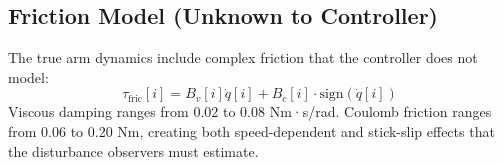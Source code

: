 \subsection{Friction Model (Unknown to Controller)}
The true arm dynamics include complex friction that the controller does not model:
\begin{equation}
    \tau_{\text{fric}}[i] = B_{v}[i] \dot{q}[i] + B_{c}[i] \cdot \text{sign}(\dot{q}[i])
\end{equation}
Viscous damping ranges from 0.02 to 0.08 Nm·s/rad. Coulomb friction ranges from 0.06 to 0.20 Nm, creating both speed-dependent and stick-slip effects that the disturbance observers must estimate.
